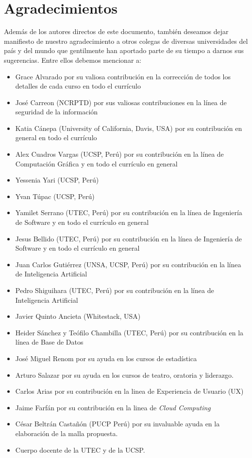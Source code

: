 \chapter*{Agradecimientos}\label{chap:cs-ack}
%

Además de los autores directos de este documento, también deseamos dejar manifiesto de nuestro 
agradecimiento a otros colegas de diversas universidades del país y del mundo que gentilmente 
han aportado parte de su tiempo a darnos sus sugerencias. Entre ellos debemos mencionar a:

\begin{itemize}
\item Grace Alvarado por su valiosa contribución en la corrección de todos los detalles de cada curso en todo el currículo
\item José Carreon (NCRPTD) por sus valiosas contribuciones en la línea de seguridad de la información
\item Katia Cánepa (University of California, Davis, USA) por su contribución en general en todo el currículo
\item Alex Cuadros Vargas (UCSP, Perú) por su contribución en la línea de Computación Gráfica y en todo el currículo en general
\item Yessenia Yari (UCSP, Perú)
\item Yvan Túpac (UCSP, Perú)
\item Yamilet Serrano (UTEC, Perú) por su contribución en la línea de Ingeniería de Software y en todo el currículo en general
\item Jesus Bellido (UTEC, Perú) por su contribución en la línea de Ingeniería de Software y en todo el currículo en general
\item Juan Carlos Gutiérrez (UNSA, UCSP, Perú) por su contribución en la línea de Inteligencia Artificial 
\item Pedro Shiguihara (UTEC, Perú) por su contribución en la línea de Inteligencia Artificial 
\item Javier Quinto Ancieta (Whitestack, USA)
\item Heider Sánchez y Teófilo Chambilla (UTEC, Perú) por su contribución en la línea de Base de Datos
\item José Miguel Renom por su ayuda en los cursos de estadística
\item Arturo Salazar por su ayuda en los cursos de teatro, oratoria y liderazgo.
\item Carlos Arias por su contribución en la linea de Experiencia de Usuario (UX)
\item Jaime Farfán por su contribución en la linea de \textit{Cloud Computing}
\item César Beltrán Castañón (PUCP Perú) por su invaluable ayuda en la elaboración de la malla propuesta.
\item Cuerpo docente de la UTEC y de la UCSP.
\end{itemize}

